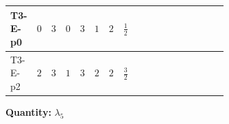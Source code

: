 \documentclass[8pt]{article}
\begin{document}
\begin{landscape}
\begin{longtable}{@{}llcccccc >{\raggedright\arraybackslash}p{0.21\linewidth} >{\raggedright\arraybackslash}p{0.21\linewidth} >{\raggedright\arraybackslash}p{0.21\linewidth}@{}}
\midrule
T3-E-p0 & $0$ & $3$ & $0$ & $3$ & $1$ & $2$ & $\frac{1}{2}$ & \scriptsize\adjustbox{max width=\linewidth}{$\begin{gathered} +2 {\lambda_{12}^{(1)}} {\lambda_5}\end{gathered}$} & \scriptsize\adjustbox{max width=\linewidth}{$\begin{gathered} +2 {\lambda_1} {\lambda_5}\end{gathered}$} & \scriptsize\adjustbox{max width=\linewidth}{$\begin{gathered} +4 {\lambda_{HS_1}^{(1)}} {\lambda_5}\end{gathered}$} \\
\midrule
T3-E-p2 & $2$ & $3$ & $1$ & $3$ & $2$ & $2$ & $\frac{3}{2}$ & \scriptsize\adjustbox{max width=\linewidth}{$\begin{gathered} +2 {\lambda_{12}^{(1)}} {\lambda_5}\end{gathered}$} & \scriptsize\adjustbox{max width=\linewidth}{$\begin{gathered} +2 {\lambda_1} {\lambda_5}\end{gathered}$} & \scriptsize\adjustbox{max width=\linewidth}{$\begin{gathered} +4 {\lambda_{HS_1}^{(1)}} {\lambda_5}\end{gathered}$} \\
\midrule
\bottomrule
\end{longtable}
\clearpage
\noindent\textbf{Quantity: }$\lambda_5$\par\smallskip

\end{landscape}
\end{document}
